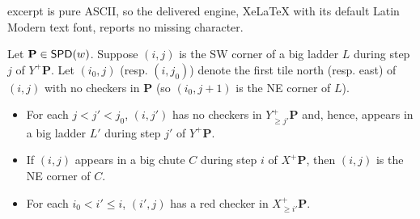 \documentclass[10pt,a4paper]{amsart}
\DeclareMathOperator{\SPD}{\sf{SPD}}
\newcommand{\bfP}{\mathbf{P}}
\begin{document}
excerpt is pure ASCII, so the delivered engine, XeLaTeX with its default Latin Modern text font, reports no missing character.
\begin{lemma}
\label{lem:SW corner of big ladder}
    Let $\bfP\in \SPD(w)$.
    Suppose $(i,j)$ is the SW corner of a big ladder $L$ during step $j$ of $Y^+\bfP$.
    Let $(i_0,j)$ (resp. $(i,j_0)$) denote the first tile north (resp. east) of $(i,j)$ with no checkers in $\bfP$ (so $(i_0,j+1)$ is the NE corner of $L$).
    
    \begin{itemize}
    \item[(i)]
    For each $j<j'< j_0$, $(i,j')$ has no checkers in $Y^+_{\geq j'} \bfP$ and, hence, appears in a big ladder $L'$ during step $j'$ of $Y^+\bfP$.
    
    \item[(ii)]
    If $(i,j)$ appears in a big chute $C$ during step $i$ of $X^+\bfP$, then $(i,j)$ is the NE corner of $C$.
    
    \item[(iii)]
    For each $i_0 < i'\leq i$, $(i',j)$ has a red checker in $X^+_{\geq i'} \bfP$.
    \end{itemize}
\end{lemma}
\end{document}
